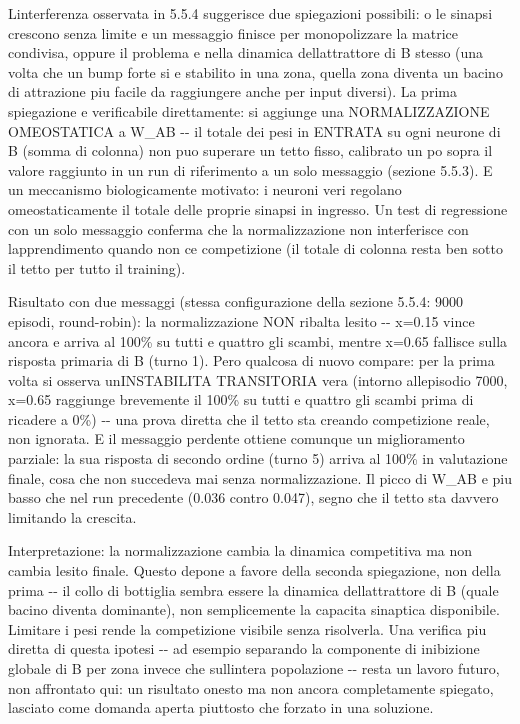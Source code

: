\documentclass[
  italian,
]{article}
\begin{document}
L\textquotesingle interferenza osservata in 5.5.4 suggerisce due spiegazioni possibili: o le sinapsi crescono senza limite e un messaggio finisce per monopolizzare la matrice condivisa, oppure il problema e\textquotesingle{} nella dinamica dell\textquotesingle attrattore di B stesso (una volta che un bump forte si e\textquotesingle{} stabilito in una zona, quella zona diventa un bacino di attrazione piu\textquotesingle{} facile da raggiungere anche per input diversi). La prima spiegazione e\textquotesingle{} verificabile direttamente: si aggiunge una NORMALIZZAZIONE OMEOSTATICA a W\_\allowbreak{}AB -\/- il totale dei pesi in ENTRATA su ogni neurone di B (somma di colonna) non puo\textquotesingle{} superare un tetto fisso, calibrato un po\textquotesingle{} sopra il valore raggiunto in un run di riferimento a un solo messaggio (sezione 5.5.3). E\textquotesingle{} un meccanismo biologicamente motivato: i neuroni veri regolano omeostaticamente il totale delle proprie sinapsi in ingresso. Un test di regressione con un solo messaggio conferma che la normalizzazione non interferisce con l\textquotesingle apprendimento quando non c\textquotesingle e\textquotesingle{} competizione (il totale di colonna resta ben sotto il tetto per tutto il training).

Risultato con due messaggi (stessa configurazione della sezione 5.5.4: 9000 episodi, round-robin): la normalizzazione NON ribalta l\textquotesingle esito -\/- x=0.15 vince ancora e arriva al 100\% su tutti e quattro gli scambi, mentre x=0.65 fallisce sulla risposta primaria di B (turno 1). Pero\textquotesingle{} qualcosa di nuovo compare: per la prima volta si osserva un\textquotesingle INSTABILITA\textquotesingle{} TRANSITORIA vera (intorno all\textquotesingle episodio 7000, x=0.65 raggiunge brevemente il 100\% su tutti e quattro gli scambi prima di ricadere a 0\%) -\/- una prova diretta che il tetto sta creando competizione reale, non ignorata. E il messaggio perdente ottiene comunque un miglioramento parziale: la sua risposta di secondo ordine (turno 5) arriva al 100\% in valutazione finale, cosa che non succedeva mai senza normalizzazione. Il picco di W\_\allowbreak{}AB e\textquotesingle{} piu\textquotesingle{} basso che nel run precedente (0.036 contro 0.047), segno che il tetto sta davvero limitando la crescita.

Interpretazione: la normalizzazione cambia la dinamica competitiva ma non cambia l\textquotesingle esito finale. Questo depone a favore della seconda spiegazione, non della prima -\/- il collo di bottiglia sembra essere la dinamica dell\textquotesingle attrattore di B (quale bacino diventa dominante), non semplicemente la capacita\textquotesingle{} sinaptica disponibile. Limitare i pesi rende la competizione visibile senza risolverla. Una verifica piu\textquotesingle{} diretta di questa ipotesi -\/- ad esempio separando la componente di inibizione globale di B per zona invece che sull\textquotesingle intera popolazione -\/- resta un lavoro futuro, non affrontato qui: un risultato onesto ma non ancora completamente spiegato, lasciato come domanda aperta piuttosto che forzato in una soluzione.
\end{document}
